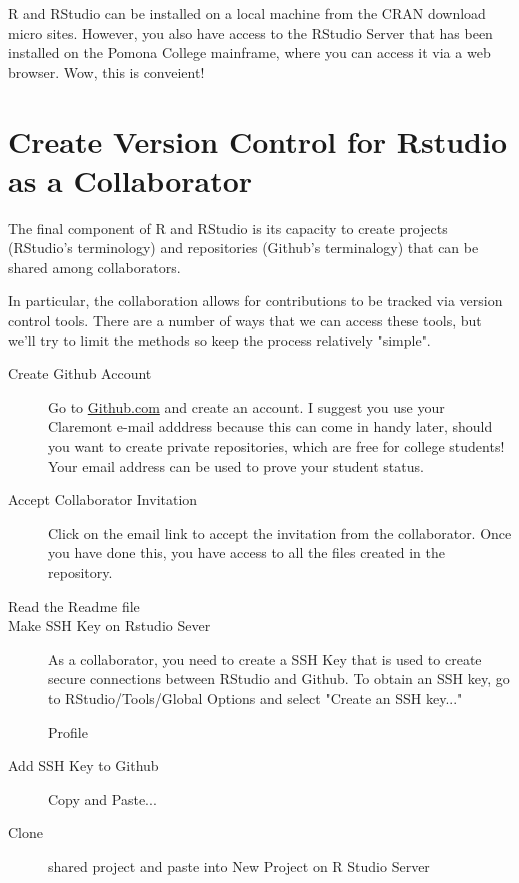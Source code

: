 \documentclass{article}
\begin{document}
R and RStudio can be installed on a local machine from the CRAN download micro sites. However, you also have access to the RStudio Server that has been installed on the Pomona College mainframe, where you can access it via a web browser. Wow, this is conveient!

\section{Create Version Control for Rstudio as a Collaborator}

The final component of R and RStudio is its capacity to create projects (RStudio's terminology) and repositories (Github's terminalogy) that can be shared among collaborators. 

In particular, the collaboration allows for contributions to be tracked via version control tools. There are a number of ways that we can access these tools, but we'll try to limit the methods so keep the process relatively "simple".

\begin{description}
  \item[Create Github Account] Go to \href{http:\\github.com}{Github.com} and create an account. I suggest you use your Claremont e-mail adddress because this can come in handy later, should you want to create private repositories, which are free for college students! Your email address can be used to prove your student status.
  
  \item[Accept Collaborator Invitation] Click on the email link to accept the invitation from the collaborator. Once you have done this, you have access to all the files created in the repository. 
  
  \item[Read the Readme file]

  \item[Make SSH Key on Rstudio Sever] As a collaborator, you need to create a SSH Key that is used to create secure connections between RStudio and Github. To obtain an SSH key, go to RStudio/Tools/Global Options and select "Create an SSH key..."
  
  Profile
  \item[Add SSH Key to Github] Copy and Paste...
  \item[Clone] shared project and paste into New Project on R Studio Server
\end{description}
\end{document}
